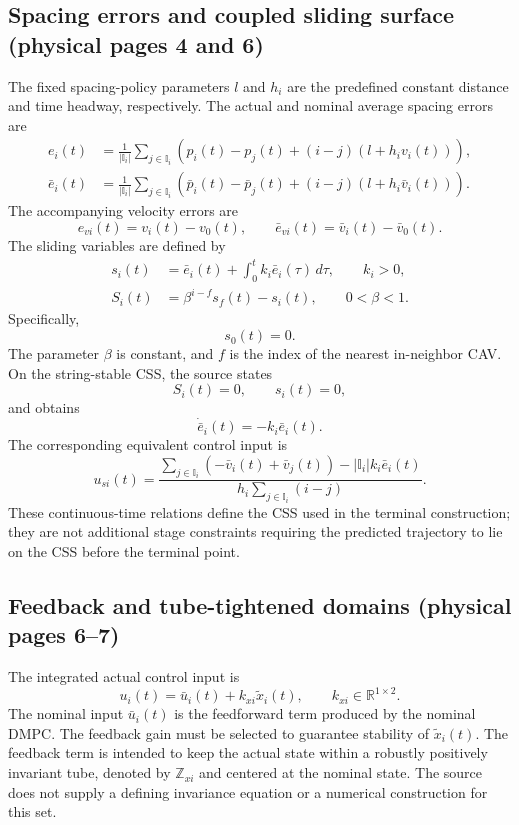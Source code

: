 \documentclass{article}
\begin{document}
\subsection*{Spacing errors and coupled sliding surface (physical pages 4 and 6)}
The fixed spacing-policy parameters $l$ and $h_i$ are the predefined constant distance and time headway, respectively. The actual and nominal average spacing errors are
\begin{align}
e_i(t)&=\frac{1}{|\mathbb I_i|}\sum_{j\in\mathbb I_i}
\left(p_i(t)-p_j(t)+(i-j)(l+h_iv_i(t))\right),\tag{4}\\
\bar e_i(t)&=\frac{1}{|\mathbb I_i|}\sum_{j\in\mathbb I_i}
\left(\bar p_i(t)-\bar p_j(t)+(i-j)(l+h_i\bar v_i(t))\right).\tag{5}
\end{align}
The accompanying velocity errors are
\[
e_{vi}(t)=v_i(t)-v_0(t),\qquad
\bar e_{vi}(t)=\bar v_i(t)-\bar v_0(t).
\]
The sliding variables are defined by
\begin{align}
s_i(t)&=\bar e_i(t)+\int_0^t k_i\bar e_i(\tau)\,d\tau,
\qquad k_i>0,\tag{8}\\
S_i(t)&=\beta^{i-f}s_f(t)-s_i(t),\qquad 0<\beta<1.\tag{9}
\end{align}
Specifically,
\[
s_0(t)=0.
\]
The parameter $\beta$ is constant, and $f$ is the index of the nearest in-neighbor CAV. On the string-stable CSS, the source states
\[
S_i(t)=0,\qquad s_i(t)=0,
\]
and obtains
\begin{equation}
\dot{\bar e}_i(t)=-k_i\bar e_i(t).
\tag{10}
\end{equation}
The corresponding equivalent control input is
\begin{equation}
u_{si}(t)=
\frac{\displaystyle\sum_{j\in\mathbb I_i}
\left(-\bar v_i(t)+\bar v_j(t)\right)-|\mathbb I_i|k_i\bar e_i(t)}
{\displaystyle h_i\sum_{j\in\mathbb I_i}(i-j)}.
\tag{11}
\end{equation}
These continuous-time relations define the CSS used in the terminal construction; they are not additional stage constraints requiring the predicted trajectory to lie on the CSS before the terminal point.

\subsection*{Feedback and tube-tightened domains (physical pages 6--7)}
The integrated actual control input is
\begin{equation}
u_i(t)=\bar u_i(t)+k_{xi}\widetilde x_i(t),
\qquad k_{xi}\in\mathbb R^{1\times2}.
\tag{12}
\end{equation}
The nominal input $\bar u_i(t)$ is the feedforward term produced by the nominal DMPC. The feedback gain must be selected to guarantee stability of $\widetilde x_i(t)$. The feedback term is intended to keep the actual state within a robustly positively invariant tube, denoted by $\mathbb Z_{xi}$ and centered at the nominal state. The source does not supply a defining invariance equation or a numerical construction for this set.
\end{document}
